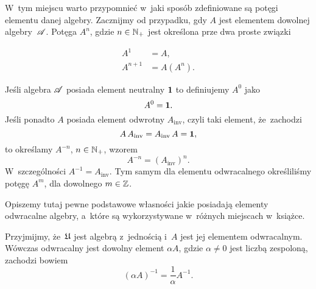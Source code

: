 \documentclass[a4paper,11pt]{article}
\numberwithin{equation}{section}
\begin{document}
\VerSpaceFour





\noindent
{} W~tym miejscu warto przypomnieć w~jaki sposób zdefiniowane są
potęgi elementu danej algebry. Zacznijmy od przypadku, gdy $A$ jest
elementem dowolnej algebry~$\mathcal{A}$. Potęga $A^{ n }$, gdzie
$n \in \mathbb{N}_{ + }$ jest określona prze dwa proste związki

\negVerSpaceFour


\begin{subequations}

  \begin{align}
    \label{eq:Bratteli-Robinson-Operator-Algebras-ETC-Vol-I-s01-15-A}
    A^{ 1 } &= A, \\
    \label{eq:Bratteli-Robinson-Operator-Algebras-ETC-Vol-I-s01-15-B}
    A^{ n + 1 } &= A ( A^{ n } ).
  \end{align}

\end{subequations}


\noindent
Jeśli algebra $\mathcal{A}$ posiada element neutralny $\mathbf{1}$ to definiujemy
$A^{ 0 }$ jako
\begin{equation}
  \label{eq:Bratteli-Robinson-Operator-Algebras-ETC-Vol-I-s01-16}
  A^{ 0 } = \mathbf{1}.
\end{equation}
Jeśli ponadto $A$ posiada element odwrotny $A_{ \textrm{inv} }$, czyli taki
element, że~zachodzi
\begin{equation}
  \label{eq:Bratteli-Robinson-Operator-Algebras-ETC-Vol-I-s01-17}
  A \, A_{ \textrm{inv} } = A_{ \textrm{inv} } \, A = \mathbf{1},
\end{equation}
to określamy $A^{ -n }$, $n \in \mathbb{N}_{ + }$, wzorem
\begin{equation}
  \label{eq:Bratteli-Robinson-Operator-Algebras-ETC-Vol-I-s01-18}
  A^{ -n } = ( A_{ \textrm{inv} } )^{ n }.
\end{equation}
W~szczególności $A^{ -1 } = A_{ \textrm{inv} }$. Tym samym dla elementu
odwracalnego określiliśmy potęgę $A^{ m }$, dla dowolnego $m \in \mathbb{Z}$.

\VerSpaceFour





\noindent
{} Opiszemy tutaj pewne podstawowe własności jakie posiadają
elementy odwracalne algebry, a~które są wykorzystywane w~różnych miejscach
w~książce.

Przyjmijmy, że~$\mathfrak{U}$ jest algebrą z~jednością i~$A$ jest jej elementem
odwracalnym. Wówczas odwracalny jest dowolny element $\alpha A$, gdzie $\alpha \neq 0$
jest liczbą zespoloną, zachodzi bowiem
\begin{equation}
  \label{eq:Bratteli-Robinson-Operator-Algebras-ETC-Vol-I-s01-19}
  ( \alpha A )^{ -1 } = \frac{ 1 }{ \alpha } A^{ -1 }.
\end{equation}
\end{document}
